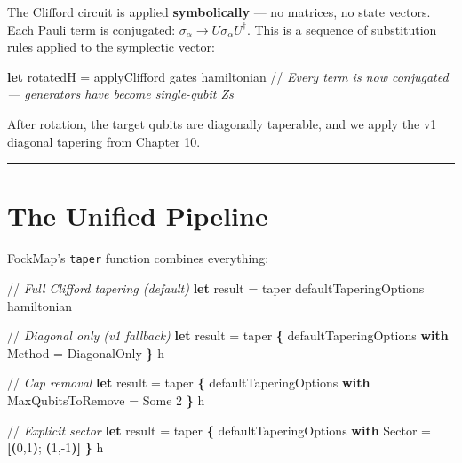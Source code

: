 \documentclass[
  11pt,
  oneside]{book}
\newenvironment{Shaded}{\begin{snugshade}}{\end{snugshade}}
\newcommand{\CommentTok}[1]{\textcolor[rgb]{0.56,0.35,0.01}{\textit{#1}}}
\newcommand{\DecValTok}[1]{\textcolor[rgb]{0.00,0.00,0.81}{#1}}
\newcommand{\KeywordTok}[1]{\textcolor[rgb]{0.13,0.29,0.53}{\textbf{#1}}}
\newcommand{\NormalTok}[1]{#1}
\newcommand{\OperatorTok}[1]{\textcolor[rgb]{0.81,0.36,0.00}{\textbf{#1}}}
\begin{document}
The Clifford circuit is applied \textbf{symbolically} --- no matrices,
no state vectors. Each Pauli term is conjugated:
\(\sigma_\alpha \to U \sigma_\alpha U^\dagger\). This is a sequence of
substitution rules applied to the symplectic vector:

\begin{Shaded}
\begin{Highlighting}[]
\KeywordTok{let}\NormalTok{ rotatedH = applyClifford gates hamiltonian}
\NormalTok{//}\CommentTok{ Every term is now conjugated --- generators have become single{-}qubit Zs}
\end{Highlighting}
\end{Shaded}

After rotation, the target qubits are diagonally taperable, and we apply
the v1 diagonal tapering from Chapter 10.

\begin{center}\rule{0.5\linewidth}{0.5pt}\end{center}

\section{The Unified Pipeline}\label{the-unified-pipeline}

FockMap's \texttt{taper} function combines everything:

\begin{Shaded}
\begin{Highlighting}[]
\NormalTok{//}\CommentTok{ Full Clifford tapering (default)}
\KeywordTok{let}\NormalTok{ result = taper defaultTaperingOptions hamiltonian}

\NormalTok{//}\CommentTok{ Diagonal only (v1 fallback)}
\KeywordTok{let}\NormalTok{ result = taper }\OperatorTok{\{}\NormalTok{ defaultTaperingOptions }\KeywordTok{with}\NormalTok{ Method = DiagonalOnly }\OperatorTok{\}}\NormalTok{ h}

\NormalTok{//}\CommentTok{ Cap removal}
\KeywordTok{let}\NormalTok{ result = taper }\OperatorTok{\{}\NormalTok{ defaultTaperingOptions }\KeywordTok{with}\NormalTok{ MaxQubitsToRemove = Some }\DecValTok{2} \OperatorTok{\}}\NormalTok{ h}

\NormalTok{//}\CommentTok{ Explicit sector}
\KeywordTok{let}\NormalTok{ result = taper }\OperatorTok{\{}\NormalTok{ defaultTaperingOptions }\KeywordTok{with}\NormalTok{ Sector = }\OperatorTok{[(}\DecValTok{0}\NormalTok{,}\DecValTok{1}\OperatorTok{)}\NormalTok{; }\OperatorTok{(}\DecValTok{1}\NormalTok{,}\DecValTok{{-}1}\OperatorTok{)]} \OperatorTok{\}}\NormalTok{ h}
\end{Highlighting}
\end{Shaded}
\end{document}
